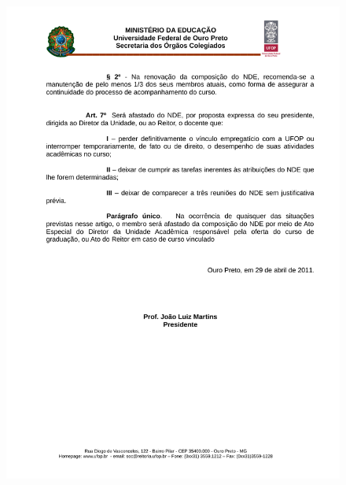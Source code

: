 \begin{figure}[p]
	\centering 
	\includegraphics[scale=0.7]{capitulos/resolucoes/cepe4450/cepe4450-p3.pdf}
\end{figure} \pagebreak


